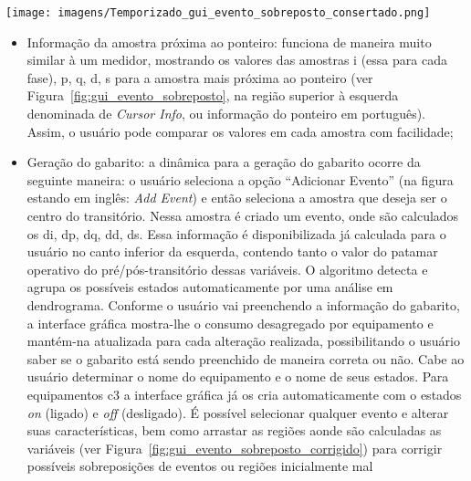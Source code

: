 \begin{sidewaysfigure}[p]
\texttt{[image: imagens/Temporizado\_gui\_evento\_sobreposto\_consertado.png]}
\caption[Informação gráfica para o Módulo de Interação Gráfica com os
Dados: Evento de Transitório Corrigido.]{
Informação gráfica para o Módulo de Interação Gráfica com os
Dados: Evento de Transitório Corrigido. A sobreposição foi corrigida
ao arrastar a região com o ponteiro, o que resulta em uma
estimativa de consumo mais fiel.}
\label{fig:gui_evento_sobreposto_corrigido}
\end{sidewaysfigure}

\begin{itemize}
\item Informação da amostra próxima ao ponteiro: funciona de maneira
muito similar à um medidor, mostrando os valores das amostras \acs{i}
(essa para cada fase), \acs{p}, \acs{q}, \acs{d}, \acs{s} para a
amostra mais próxima ao ponteiro (ver
Figura~\ref{fig:gui_evento_sobreposto}, na região superior à esquerda
denominada de \emph{Cursor Info}, ou informação do ponteiro em
português). Assim, o usuário pode comparar os
valores em cada amostra com facilidade;
\item Geração do gabarito: a dinâmica para a geração do gabarito
ocorre da seguinte maneira: o usuário
seleciona a opção ``Adicionar Evento'' (na figura estando em inglês:
\emph{Add Event}) e então seleciona a amostra que deseja ser o centro
do transitório. Nessa amostra é criado um evento, onde são calculados
os \acs{di}, \acs{dp}, \acs{dq}, \acs{dd}, \acs{ds}. Essa informação é
disponibilizada já calculada para o usuário no canto inferior da
esquerda, contendo tanto o valor do patamar operativo do 
pré/pós-transitório dessas variáveis. O algoritmo
detecta e agrupa os possíveis estados automaticamente por uma análise
em dendrograma. Conforme o usuário vai preenchendo a informação do
gabarito, a interface gráfica mostra-lhe o consumo desagregado por
equipamento e mantém-na atualizada para cada alteração realizada,
possibilitando o usuário saber se o gabarito está sendo preenchido de
maneira correta ou não. Cabe ao usuário determinar o nome do equipamento
e o nome de seus estados. Para equipamentos \acs{c3} a interface gráfica
já os cria automaticamente com o estados \emph{on} (ligado) e
\emph{off} (desligado). É possível selecionar qualquer evento e
alterar suas características, bem como arrastar as regiões aonde são
calculadas as variáveis (ver
Figura~\ref{fig:gui_evento_sobreposto_corrigido}) para corrigir
possíveis sobreposições de eventos ou regiões inicialmente mal

\end{itemize}
